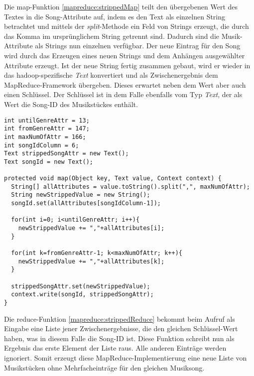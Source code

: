 Die map-Funktion \ref{mapreduce:strippedMap} teilt den übergebenen Wert des Textes in die Song-Attribute auf, indem es den Text
als einzelnen String betrachtet und mittels der \textit{split}-Methode ein Feld von Strings erzeugt, die durch
das Komma im ursprünglichem String getrennt sind. Dadurch sind die Musik-Attribute als Strings nun einzelnen verfügbar.
Der neue Eintrag für den Song wird durch das Erzeugen eines neuen Strings und dem Anhängen ausgewählter
Attribute erzeugt. Ist der neue String fertig zusammen gebaut, wird er wieder in das hadoop-spezifische \textit{Text}
konvertiert und als Zwischenergebnis dem MapReduce-Framework übergeben. Dieses erwartet neben dem 
Wert aber auch einen Schlüssel. Der Schlüssel ist in dem Falle ebenfalls vom Typ \textit{Text}, der als Wert die
Song-ID des Musikstückes enthält.


\begin{lstlisting}[caption={Map-Funktion zur Entfernung von mehrfachen Musikeinträgen}, label=mapreduce:strippedMap]
int untilGenreAttr = 13;
int fromGenreAttr = 147;
int maxNumOfAttr = 166;
int songIdColumn = 6;
Text strippedSongAttr = new Text();
Text songId = new Text();

protected void map(Object key, Text value, Context context) {
  String[] allAttributes = value.toString().split(",", maxNumOfAttr);
  String newStrippedValue = new String();
  songId.set(allAttributes[songIdColumn-1]);
      
  for(int i=0; i<untilGenreAttr; i++){
    newStrippedValue += ","+allAttributes[i];
  }
      
  for(int k=fromGenreAttr-1; k<maxNumOfAttr; k++){
    newStrippedValue += ","+allAttributes[k];
  }
      
  strippedSongAttr.set(newStrippedValue);
  context.write(songId, strippedSongAttr);
}
\end{lstlisting}

Die reduce-Funktion \ref{mapreduce:strippedReduce} bekommt beim Aufruf als Eingabe eine Liste jener Zwischenergebnisse, die den gleichen 
Schlüssel-Wert haben, was in diesem Falle die Song-ID ist. 
Diese Funktion schreibt nun als Ergebnis das erste Element der Liste raus. Alle anderen
Einträge werden ignoriert. Somit erzeugt diese MapReduce-Implementierung eine neue Liste
von Musikstücken ohne Mehrfacheinträge für den gleichen Musiksong.

